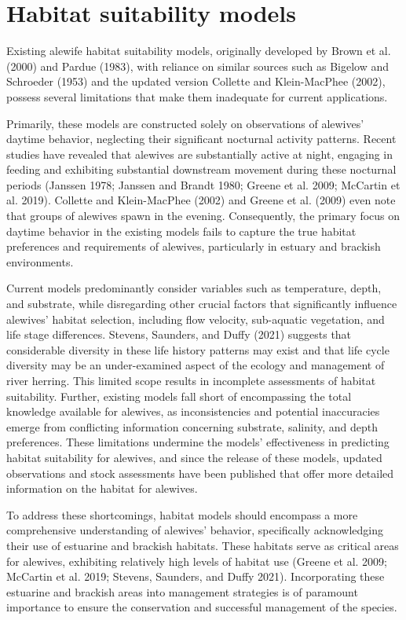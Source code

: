 \documentclass[
]{book}
\begin{document}
\hypertarget{habitat-suitability-models}{%
\section{Habitat suitability models}\label{habitat-suitability-models}}

Existing alewife habitat suitability models, originally developed by Brown et al. (2000) and Pardue (1983), with reliance on similar sources such as Bigelow and Schroeder (1953) and the updated version Collette and Klein-MacPhee (2002), possess several limitations that make them inadequate for current applications.

Primarily, these models are constructed solely on observations of alewives' daytime behavior, neglecting their significant nocturnal activity patterns.
Recent studies have revealed that alewives are substantially active at night, engaging in feeding and exhibiting substantial downstream movement during these nocturnal periods (Janssen 1978; Janssen and Brandt 1980; Greene et al. 2009; McCartin et al. 2019).
Collette and Klein-MacPhee (2002) and Greene et al. (2009) even note that groups of alewives spawn in the evening. Consequently, the primary focus on daytime behavior in the existing models fails to capture the true habitat preferences and requirements of alewives, particularly in estuary and brackish environments.

Current models predominantly consider variables such as temperature, depth, and substrate, while disregarding other crucial factors that significantly influence alewives' habitat selection, including flow velocity, sub-aquatic vegetation, and life stage differences. Stevens, Saunders, and Duffy (2021) suggests that considerable diversity in these life history patterns may exist and that life cycle diversity may be an under-examined aspect of the ecology and management of river herring. This limited scope results in incomplete assessments of habitat suitability. Further, existing models fall short of encompassing the total knowledge available for alewives, as inconsistencies and potential inaccuracies emerge from conflicting information concerning substrate, salinity, and depth preferences. These limitations undermine the models' effectiveness in predicting habitat suitability for alewives, and since the release of these models, updated observations and stock assessments have been published that offer more detailed information on the habitat for alewives.

To address these shortcomings, habitat models should encompass a more comprehensive understanding of alewives' behavior, specifically acknowledging their use of estuarine and brackish habitats. These habitats serve as critical areas for alewives, exhibiting relatively high levels of habitat use (Greene et al. 2009; McCartin et al. 2019; Stevens, Saunders, and Duffy 2021). Incorporating these estuarine and brackish areas into management strategies is of paramount importance to ensure the conservation and successful management of the species.
\end{document}
